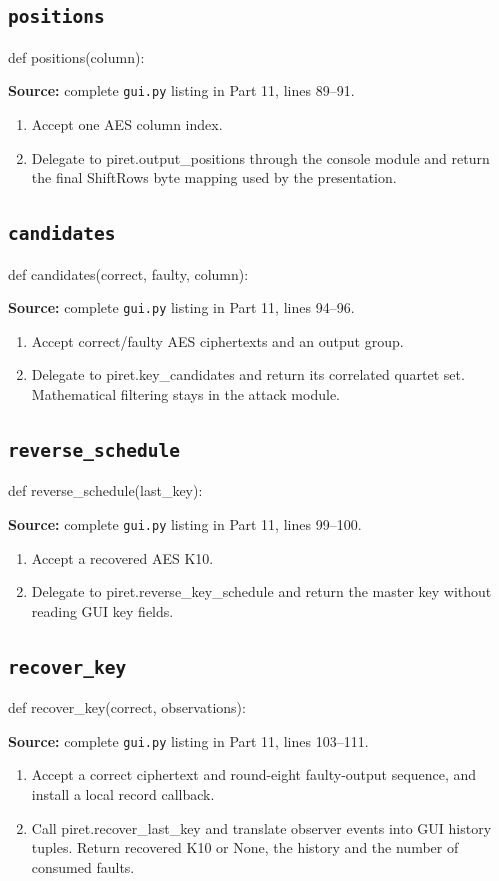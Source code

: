 \subsection{\texttt{positions}}
\begin{lightcode}
def positions(column):
\end{lightcode}
\noindent\textbf{Source:} complete \texttt{gui.py} listing in Part 11, lines 89--91.
\begin{enumerate}
\item Accept one AES column index.
\item Delegate to piret.output\_positions through the console module and return the final ShiftRows byte mapping used by the presentation.
\end{enumerate}
\subsection{\texttt{candidates}}
\begin{lightcode}
def candidates(correct, faulty, column):
\end{lightcode}
\noindent\textbf{Source:} complete \texttt{gui.py} listing in Part 11, lines 94--96.
\begin{enumerate}
\item Accept correct/faulty AES ciphertexts and an output group.
\item Delegate to piret.key\_candidates and return its correlated quartet set. Mathematical filtering stays in the attack module.
\end{enumerate}
\subsection{\texttt{reverse\_\allowbreak{}schedule}}
\begin{lightcode}
def reverse_schedule(last_key):
\end{lightcode}
\noindent\textbf{Source:} complete \texttt{gui.py} listing in Part 11, lines 99--100.
\begin{enumerate}
\item Accept a recovered AES K10.
\item Delegate to piret.reverse\_key\_schedule and return the master key without reading GUI key fields.
\end{enumerate}
\subsection{\texttt{recover\_\allowbreak{}key}}
\begin{lightcode}
def recover_key(correct, observations):
\end{lightcode}
\noindent\textbf{Source:} complete \texttt{gui.py} listing in Part 11, lines 103--111.
\begin{enumerate}
\item Accept a correct ciphertext and round-eight faulty-output sequence, and install a local record callback.
\item Call piret.recover\_last\_key and translate observer events into GUI history tuples. Return recovered K10 or None, the history and the number of consumed faults.
\end{enumerate}
